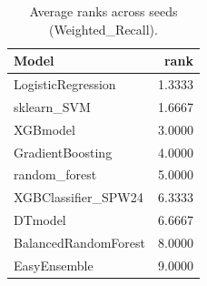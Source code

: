 \begin{table}[t]
\centering
\begin{tabular}{lr}
\toprule
Model & rank \\
\midrule
LogisticRegression & 1.3333 \\
sklearn_SVM & 1.6667 \\
XGBmodel & 3.0000 \\
GradientBoosting & 4.0000 \\
random_forest & 5.0000 \\
XGBClassifier_SPW24 & 6.3333 \\
DTmodel & 6.6667 \\
BalancedRandomForest & 8.0000 \\
EasyEnsemble & 9.0000 \\
\bottomrule
\end{tabular}
\caption{Average ranks across seeds (Weighted_Recall).}
\label{tab:avg_rank_Weighted_Recall}
\end{table}